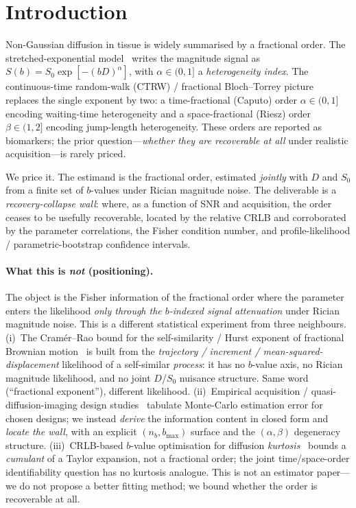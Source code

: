 \documentclass[11pt]{article}
\begin{document}
\section{Introduction}
\label{sec:intro}
Non-Gaussian diffusion in tissue is widely summarised by a fractional order. The
stretched-exponential model~\citep{bennett2003} writes the magnitude signal as
$S(b)=S_0\exp[-(bD)^\alpha]$, with $\alpha\in(0,1]$ a \emph{heterogeneity index}. The
continuous-time random-walk (CTRW) / fractional Bloch--Torrey
picture~\citep{magin2013} replaces the single exponent by two: a time-fractional (Caputo)
order $\alpha\in(0,1]$ encoding waiting-time heterogeneity and a space-fractional (Riesz)
order $\beta\in(1,2]$ encoding jump-length heterogeneity. These orders are reported as
biomarkers; the prior question---\emph{whether they are recoverable at all} under realistic
acquisition---is rarely priced.

We price it. The estimand is the fractional order, estimated \emph{jointly} with $D$ and $S_0$
from a finite set of $b$-values under Rician magnitude noise. The deliverable is a
\emph{recovery-collapse wall}: where, as a function of SNR and acquisition, the order ceases to
be usefully recoverable, located by the relative CRLB and corroborated by the parameter
correlations, the Fisher condition number, and profile-likelihood / parametric-bootstrap
confidence intervals.

\paragraph{What this is \emph{not} (positioning).}
The object is the Fisher information of the fractional order where the parameter enters the
likelihood \emph{only through the $b$-indexed signal attenuation} under Rician magnitude noise.
This is a different statistical experiment from three neighbours.
(i)~The Cram\'er--Rao bound for the self-similarity / Hurst exponent of fractional Brownian
motion~\citep{coeurjolly2001} is built from the \emph{trajectory / increment / mean-squared-%
displacement} likelihood of a self-similar \emph{process}: it has no $b$-value axis, no Rician
magnitude likelihood, and no joint $D$/$S_0$ nuisance structure. Same word
(``fractional exponent''), different likelihood.
(ii)~Empirical acquisition / quasi-diffusion-imaging design
studies~\citep{spilling2022} tabulate Monte-Carlo estimation error for chosen designs; we
instead \emph{derive} the information content in closed form and \emph{locate the wall}, with an
explicit $(n_b,b_{\max})$ surface and the $(\alpha,\beta)$ degeneracy structure.
(iii)~CRLB-based $b$-value optimisation for diffusion \emph{kurtosis}~\citep{poot2010} bounds a
\emph{cumulant} of a Taylor expansion, not a fractional order; the joint time/space-order
identifiability question has no kurtosis analogue.
This is not an estimator paper---we do not propose a better fitting method; we bound whether the
order is recoverable at all.
\end{document}
